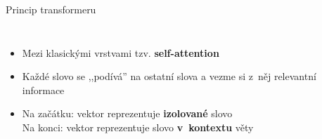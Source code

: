 
\begin{frame}{Princip transformeru}

    \begin{columns}

        \scalebox{.8}{}

        \begin{itemize}[<+->]

            \item Mezi klasickými vrstvami tzv. \textbf{self-attention}

            \item Každé slovo se ,,podívá'' na ostatní slova a vezme si z~něj
                relevantní informace

            \item Na začátku: vektor reprezentuje \textbf{izolované} slovo \\
                Na konci: vektor reprezentuje slovo \textbf{v~kontextu} věty

        \end{itemize}

    \end{columns}

    \vspace{10pt}

\end{frame}


%
%
%
%
%

